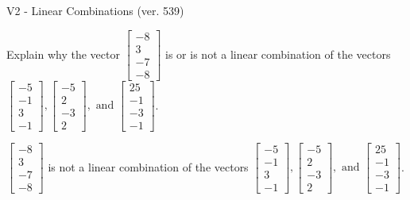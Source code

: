 \begin{exercise}
  \begin{exerciseTitle}V2 - Linear Combinations (ver. 539)\end{exerciseTitle}
  \begin{exerciseStatement}
    Explain why the vector \(\left[\begin{array}{c}
-8 \\
3 \\
-7 \\
-8
\end{array}\right]\)  is or is not a linear 
	combination of the vectors \(\left[\begin{array}{c}
-5 \\
-1 \\
3 \\
-1
\end{array}\right] , \left[\begin{array}{c}
-5 \\
2 \\
-3 \\
2
\end{array}\right] , \text{ and } \left[\begin{array}{c}
25 \\
-1 \\
-3 \\
-1
\end{array}\right]\).
	


  \end{exerciseStatement}
  \begin{exerciseAnswer}
   \(\left[\begin{array}{c}
-8 \\
3 \\
-7 \\
-8
\end{array}\right]\) 
  	 is not  
	a linear combination of the vectors \(\left[\begin{array}{c}
-5 \\
-1 \\
3 \\
-1
\end{array}\right] , \left[\begin{array}{c}
-5 \\
2 \\
-3 \\
2
\end{array}\right] , \text{ and } \left[\begin{array}{c}
25 \\
-1 \\
-3 \\
-1
\end{array}\right]\).

	
  


  \end{exerciseAnswer}
\end{exercise}